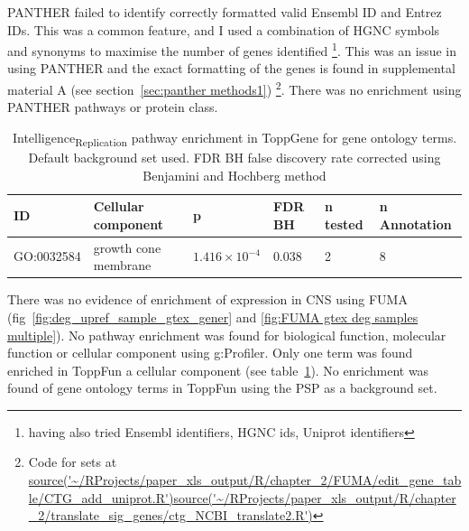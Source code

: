 PANTHER failed to identify correctly formatted valid Ensembl ID and Entrez IDs. This was a common feature, and I used a combination of HGNC symbols and synonyms  to maximise the number of genes identified \footnote{having also tried Ensembl identifiers, HGNC ids, Uniprot identifiers}. This was an issue in using PANTHER and the exact formatting of the genes is found in supplemental material A (see section~\ref{sec:panther methods1})%
\footnote{Code for sets at \url{source('~/RProjects/paper_xls_output/R/chapter_2/FUMA/edit_gene_table/CTG_add_uniprot.R')}\url{source('~/RProjects/paper_xls_output/R/chapter_2/translate_sig_genes/ctg_NCBI_translate2.R')}}. There was no enrichment using PANTHER pathways or protein class. 

\begin{table}[]
    \centering
    \begin{tabular}{llllll}
    \toprule
    ID & 	Cellular component &	 	p& 	FDR BH &	n tested & 	n Annotation\\ 
    \midrule
    GO:0032584 &	growth cone membrane &		$1.416\times10^{-4}$&0.038 	&	2& 	8       \\
        \bottomrule
    \end{tabular}
    \caption{Intelligence\textsubscript{Replication} pathway enrichment in ToppGene for gene ontology terms. Default background set used. FDR BH false discovery rate corrected using Benjamini and Hochberg method}
    \label{tab:toppgene ctg cc}
\end{table}

There was no evidence of enrichment of expression in CNS using FUMA (fig~\ref{fig:deg_upref_sample_gtex_gener} and \ref{fig:FUMA gtex deg samples multiple}). No pathway enrichment was found for biological function, molecular function or cellular component using g:Profiler. Only one term was found enriched in ToppFun a  cellular component (see table~\ref{tab:toppgene ctg cc}). No enrichment was found of gene ontology terms in ToppFun using the PSP as a background set.



 

        
